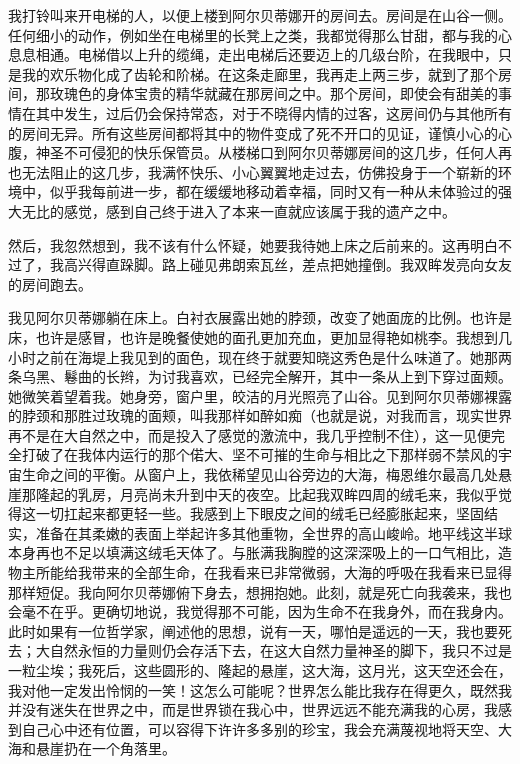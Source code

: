 \par 我打铃叫来开电梯的人，以便上楼到阿尔贝蒂娜开的房间去。房间是在山谷一侧。任何细小的动作，例如坐在电梯里的长凳上之类，我都觉得那么甘甜，都与我的心息息相通。电梯借以上升的缆绳，走出电梯后还要迈上的几级台阶，在我眼中，只是我的欢乐物化成了齿轮和阶梯。在这条走廊里，我再走上两三步，就到了那个房间，那玫瑰色的身体宝贵的精华就藏在那房间之中。那个房间，即使会有甜美的事情在其中发生，过后仍会保持常态，对于不晓得内情的过客，这房间仍与其他所有的房间无异。所有这些房间都将其中的物件变成了死不开口的见证，谨慎小心的心腹，神圣不可侵犯的快乐保管员。从楼梯口到阿尔贝蒂娜房间的这几步，任何人再也无法阻止的这几步，我满怀快乐、小心翼翼地走过去，仿佛投身于一个崭新的环境中，似乎我每前进一步，都在缓缓地移动着幸福，同时又有一种从未体验过的强大无比的感觉，感到自己终于进入了本来一直就应该属于我的遗产之中。
\par 然后，我忽然想到，我不该有什么怀疑，她要我待她上床之后前来的。这再明白不过了，我高兴得直跺脚。路上碰见弗朗索瓦丝，差点把她撞倒。我双眸发亮向女友的房间跑去。
\par 我见阿尔贝蒂娜躺在床上。白衬衣展露出她的脖颈，改变了她面庞的比例。也许是床，也许是感冒，也许是晚餐使她的面孔更加充血，更加显得艳如桃李。我想到几小时之前在海堤上我见到的面色，现在终于就要知晓这秀色是什么味道了。她那两条乌黑、鬈曲的长辫，为讨我喜欢，已经完全解开，其中一条从上到下穿过面颊。她微笑着望着我。她身旁，窗户里，皎洁的月光照亮了山谷。见到阿尔贝蒂娜裸露的脖颈和那胜过玫瑰的面颊，叫我那样如醉如痴（也就是说，对我而言，现实世界再不是在大自然之中，而是投入了感觉的激流中，我几乎控制不住），这一见便完全打破了在我体内运行的那个偌大、坚不可摧的生命与相比之下那样弱不禁风的宇宙生命之间的平衡。从窗户上，我依稀望见山谷旁边的大海，梅恩维尔最高几处悬崖那隆起的乳房，月亮尚未升到中天的夜空。比起我双眸四周的绒毛来，我似乎觉得这一切扛起来都更轻一些。我感到上下眼皮之间的绒毛已经膨胀起来，坚固结实，准备在其柔嫩的表面上举起许多其他重物，全世界的高山峻岭。地平线这半球本身再也不足以填满这绒毛天体了。与胀满我胸膛的这深深吸上的一口气相比，造物主所能给我带来的全部生命，在我看来已非常微弱，大海的呼吸在我看来已显得那样短促。我向阿尔贝蒂娜俯下身去，想拥抱她。此刻，就是死亡向我袭来，我也会毫不在乎。更确切地说，我觉得那不可能，因为生命不在我身外，而在我身内。此时如果有一位哲学家，阐述他的思想，说有一天，哪怕是遥远的一天，我也要死去；大自然永恒的力量则仍会存活下去，在这大自然力量神圣的脚下，我只不过是一粒尘埃；我死后，这些圆形的、隆起的悬崖，这大海，这月光，这天空还会在，我对他一定发出怜悯的一笑！这怎么可能呢？世界怎么能比我存在得更久，既然我并没有迷失在世界之中，而是世界锁在我心中，世界远远不能充满我的心房，我感到自己心中还有位置，可以容得下许许多多别的珍宝，我会充满蔑视地将天空、大海和悬崖扔在一个角落里。
